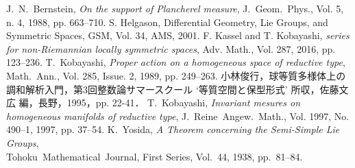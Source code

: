 \documentclass[12pt,dvipdfmx,uplatex]{jsarticle}
\begin{document}
\clearpage
\begin{thebibliography}{99}
  \vspace{-0.5em}
 J.~N.~Bernstein, \textit{On the support of Plancherel measure}, J.~Geom.~Phys., Vol. 5, n. 4, 1988, pp. 663--710.
 S. Helgason, Differential Geometry, Lie Groups, and Symmetric Spaces, GSM, Vol. 34, AMS, 2001.
 F. Kassel and T. Kobayashi, \textit{{\Poincare} series for non-Riemannian locally symmetric spaces}, Adv. Math., Vol. 287, 2016, pp. 123--236.
 T.~Kobayashi, 
  \textit{Proper action on a homogeneous space of reductive type},
  Math.~Ann., Vol. 285, Issue. 2, 1989, pp. 249--263.
 小林俊行，球等質多様体上の調和解析入門，第3回整数論サマースクール `等質空間と保型形式' 所収，佐藤文広 編，長野，1995，pp. 22-41．
 T.~Kobayashi, \textit{Invariant mesures on homogeneous manifolds of reductive type}, J.~Reine~Angew.~Math., Vol. 1997, No. 490--1, 1997, pp. 37--54.
 K.~Yosida, \textit{A Theorem concerning the Semi-Simple Lie Groups}, \\Tohoku~Mathematical~Journal, First Series, Vol.~44, 1938, pp.~81--84.
\end{thebibliography}
\end{document}
